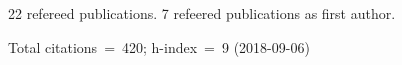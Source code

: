 22 refereed publications. 7 refeered publications as first author.

               Total citations~=~420; h-index~=~9 (2018-09-06)